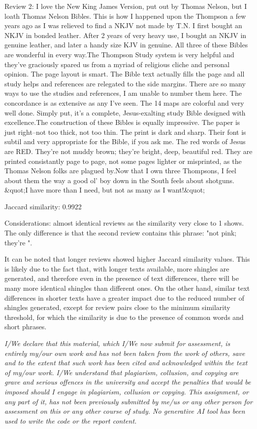 \documentclass[12pt, a4paper[]{article}
\begin{document}
\begin{itemize}
{    \item Review 2: I love the New King James Version, put out by Thomas Nelson, but I loath Thomas Nelson Bibles. This is how I happened upon the Thompson a few years ago as I was relieved to find a NKJV not made by T.N. I first bought an NKJV in bonded leather. After 2 years of very heavy use, I bought an NKJV in genuine leather, and later a handy size KJV in genuine. All three of these Bibles are wonderful in every way.The Thompson Study system is very helpful and they've graciously spared us from a myriad of religious cliche and personal opinion. The page layout is smart. The Bible text actually fills the page and all study helps and references are relegated to the side margins. There are so many ways to use the studies and references, I am unable to number them here. The concordance is as extensive as any I've seen. The 14 maps are colorful and very well done. Simply put, it's a complete, Jesus-exalting study Bible designed with excellence.The construction of these Bibles is equally impressive. The paper is just right--not too thick, not too thin. The print is dark and sharp. Their font is subtil and very appropriate for the Bible, if you ask me. The red words of Jesus are RED. They're not muddy brown; they're bright, deep, beautiful red. They are printed consistantly page to page, not some pages lighter or misprinted, as the Thomas Nelson folks are plagued by.Now that I own three Thompsons, I feel about them the way a good ol' boy down in the South feels about shotguns. &quot;I have more than I need, but not as many as I want!&quot;
    \item Jaccard similarity: 0.9922
    \item Considerations: almost identical reviews as the similarity very close to 1 shows. The only difference is that the second review contains this phrase: "not pink; they're ".
    }
\end{itemize}
\dotfill 

It can be noted that longer reviews showed higher Jaccard similarity values. This is likely due to the fact that, with longer texts available, more shingles are generated, and therefore even in the presence of text differences, there will be many more identical shingles than different ones. On the other hand, similar text differences in shorter texts have a greater impact due to the reduced number of shingles generated, except for review pairs close to the minimum similarity threshold, for which the similarity is due to the presence of common words and short phrases.


\textit{I/We declare that this material, which I/We now submit for assessment, is entirely my/our own work and has not been taken from the work of others, save and to the extent that such work has been cited and acknowledged within the text of my/our work. I/We understand that plagiarism, collusion, and copying are grave and serious offences in the university and accept the penalties that would be imposed should I engage in plagiarism, collusion or copying. This assignment, or any part of it, has not been previously submitted by me/us or any other person for assessment on this or any other course of study. No generative AI tool has been used to write the code or the report content.}
\end{document}
